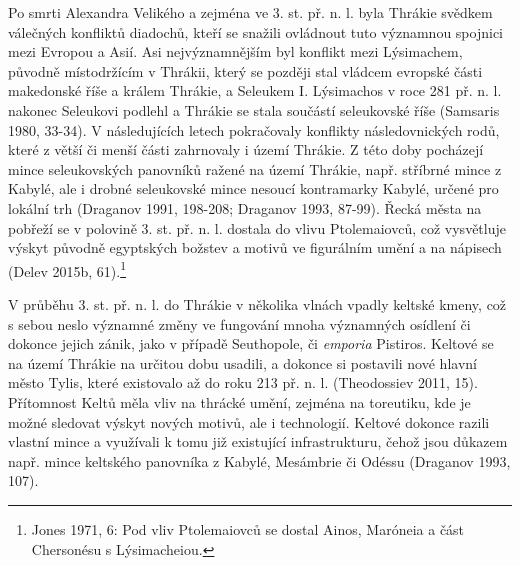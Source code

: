Po smrti Alexandra Velikého a zejména ve 3. st. př. n. l. byla Thrákie svědkem válečných konfliktů diadochů, kteří se snažili ovládnout tuto významnou spojnici mezi Evropou a Asií. Asi nejvýznamnějším byl konflikt mezi Lýsimachem, původně místodržícím v Thrákii, který se později stal vládcem evropské části makedonské říše a králem Thrákie, a Seleukem I. Lýsimachos v roce 281 př. n. l. nakonec Seleukovi podlehl a Thrákie se stala součástí seleukovské říše (Samsaris 1980, 33-34). V následujících letech pokračovaly konflikty následovnických rodů, které z větší či menší části zahrnovaly i území Thrákie. Z této doby pocházejí mince seleukovských panovníků ražené na území Thrákie, např. stříbrné mince z Kabylé, ale i drobné seleukovské mince nesoucí kontramarky Kabylé, určené pro lokální trh (Draganov 1991, 198-208; Draganov 1993, 87-99). Řecká města na pobřeží se v polovině 3. st. př. n. l. dostala do vlivu Ptolemaiovců, což vysvětluje výskyt původně egyptských božstev a motivů ve figurálním umění a na nápisech (Delev 2015b, 61).\footnote{Jones 1971, 6: Pod vliv Ptolemaiovců se dostal Ainos, Maróneia a část Chersonésu s Lýsimacheiou.}

V průběhu 3. st. př. n. l. do Thrákie v několika vlnách vpadly keltské kmeny, což s sebou neslo významné změny ve fungování mnoha významných osídlení či dokonce jejich zánik, jako v případě Seuthopole, či {\em emporia} Pistiros. Keltové se na území Thrákie na určitou dobu usadili, a dokonce si postavili nové hlavní město Tylis, které existovalo až do roku 213 př. n. l. (Theodossiev 2011, 15). Přítomnost Keltů měla vliv na thrácké umění, zejména na toreutiku, kde je možné sledovat výskyt nových motivů, ale i technologií. Keltové dokonce razili vlastní mince a využívali k tomu již existující infrastrukturu, čehož jsou důkazem např. mince keltského panovníka z Kabylé, Mesámbrie či Odéssu (Draganov 1993, 107).

